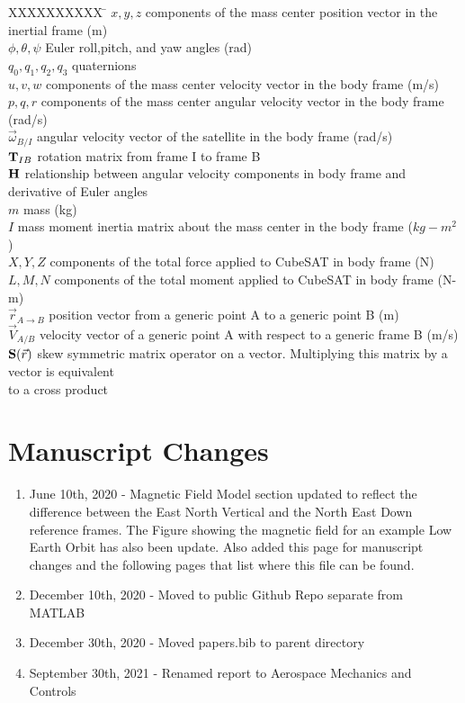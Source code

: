 \documentclass{article}
\begin{document}
\begin{tabbing}
  XXXXXXXXXX \= \kill%
  $x,y,z$ \> components of the mass center position vector in the
  inertial frame (m)  \\
  $\phi,\theta,\psi$ \> Euler roll,pitch, and yaw angles (rad) \\
  $q_0,q_1,q_2,q_3$ \>  quaternions \\  
  $u,v,w$ \> components of the mass center velocity vector in the
  body frame (m/s)  \\
  $p,q,r$ \> components of the mass center angular velocity vector in the
  body frame (rad/s)  \\
  $\vec{\omega}_{B/I}$ \> angular velocity vector of the satellite in
  the body frame (rad/s) \\
  ${\bf T}_{IB}$ \> rotation matrix from frame I to frame B \\
  ${\bf H}$ \> relationship between angular velocity components in
  body frame and derivative of Euler angles \\
  $m$ \> mass (kg) \\
  $I$ \> mass moment inertia matrix about the mass center
  in the body frame ($kg-m^2$)  \\
  $X,Y,Z$ \> components of the total force applied to CubeSAT in
  body frame (N)  \\
  $L,M,N$ \> components of the total moment applied to CubeSAT in
  body frame (N-m)  \\
  ${\vec r}_{A\rightarrow B}$ \> position vector from a generic point A
  to a generic point B (m) \\
  ${\vec V}_{A/B}$ \> velocity vector of a generic point A
  with respect to a generic frame B (m/s) \\
  ${\bf S}(\vec{r})$ \> skew symmetric matrix operator on a
  vector. Multiplying this matrix by a vector is equivalent \\
  \> to a cross product\\
\end{tabbing}

\newpage

\section*{Manuscript Changes}

\begin{enumerate}[itemsep=-5pt]
\item June 10th, 2020 - Magnetic Field Model section updated to
  reflect the difference between the East North Vertical and the North
  East Down reference frames. The Figure showing the magnetic field
  for an example Low Earth Orbit has also been update. Also added this
  page for manuscript changes and the following pages that list where
  this file can be found.
\item December 10th, 2020 - Moved to public Github Repo separate from
  MATLAB
\item December 30th, 2020 - Moved papers.bib to parent directory
\item September 30th, 2021 - Renamed report to Aerospace Mechanics and Controls
\end{enumerate}
\end{document}
